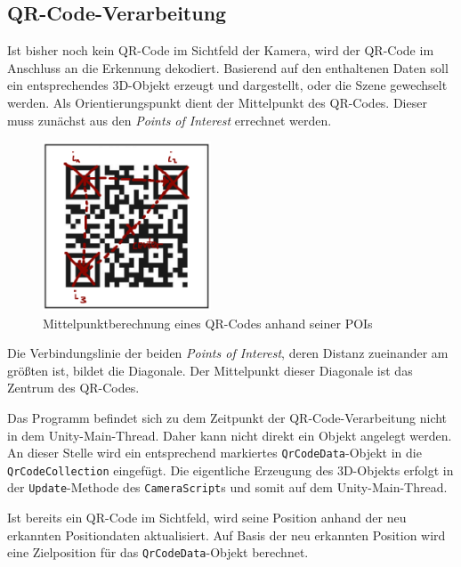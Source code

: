 \subsection{QR-Code-Verarbeitung}
Ist bisher noch kein QR-Code im Sichtfeld der Kamera, wird der QR-Code im Anschluss an die Erkennung dekodiert. Basierend auf den enthaltenen Daten soll ein entsprechendes 3D-Objekt erzeugt und dargestellt, oder die Szene gewechselt werden. Als Orientierungspunkt dient der Mittelpunkt des QR-Codes. Dieser muss zunächst aus den \emph{Points of Interest} errechnet werden.

\begin{figure}[!h]
  \centering
    \includegraphics[width=5cm]{qr_code_center}
    \caption{Mittelpunktberechnung eines QR-Codes anhand seiner POIs}
    \label{fig:qr_center}
\end{figure}

Die Verbindungslinie der beiden \emph{Points of Interest}, deren Distanz zueinander am größten ist, bildet die Diagonale. Der Mittelpunkt dieser Diagonale ist das Zentrum des QR-Codes.

Das Programm befindet sich zu dem Zeitpunkt der QR-Code-Verarbeitung nicht in dem Unity-Main-Thread. Daher kann nicht direkt ein Objekt angelegt werden. An dieser Stelle wird ein entsprechend markiertes \texttt{QrCodeData}-Objekt in die \texttt{QrCodeCollection} eingefügt. Die eigentliche Erzeugung des 3D-Objekts erfolgt in der \texttt{Update}-Methode des \texttt{CameraScript}s und somit auf dem Unity-Main-Thread.

Ist bereits ein QR-Code im Sichtfeld, wird seine Position anhand der neu erkannten Positiondaten aktualisiert. Auf Basis der neu erkannten Position wird eine Zielposition für das \texttt{QrCodeData}-Objekt berechnet.

